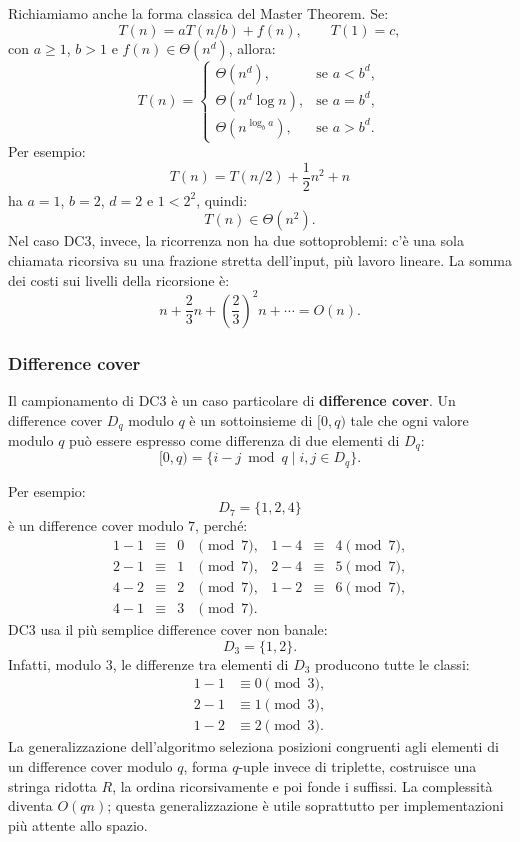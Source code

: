 \documentclass{article}
\theoremstyle{definition}
\numberwithin{equation}{section}
\begin{document}
Richiamiamo anche la forma classica del Master Theorem. Se:
\[
    T(n)=aT(n/b)+f(n),
    \qquad
    T(1)=c,
\]
con $a\geq 1$, $b>1$ e $f(n)\in \Theta(n^d)$, allora:
\[
    T(n)=
    \begin{cases}
        \Theta(n^d),          & \text{se } a<b^d, \\
        \Theta(n^d\log n),    & \text{se } a=b^d, \\
        \Theta(n^{\log_b a}), & \text{se } a>b^d.
    \end{cases}
\]
Per esempio:
\[
    T(n)=T(n/2)+\frac{1}{2}n^2+n
\]
ha $a=1$, $b=2$, $d=2$ e $1<2^2$, quindi:
\[
    T(n)\in\Theta(n^2).
\]
Nel caso DC3, invece, la ricorrenza non ha due sottoproblemi: c'è una sola chiamata ricorsiva su una frazione stretta dell'input, più lavoro lineare. La somma dei costi sui livelli della ricorsione è:
\[
    n+\frac{2}{3}n+\left(\frac{2}{3}\right)^2n+\cdots=O(n).
\]

\subsubsection{Difference cover}
Il campionamento di DC3 è un caso particolare di \textbf{difference cover}. Un difference cover $D_q$ modulo $q$ è un sottoinsieme di $[0,q)$ tale che ogni valore modulo $q$ può essere espresso come differenza di due elementi di $D_q$:
\begin{equation}\label{eq:difference_cover_definition}
    [0,q)
    =
    \{i-j \bmod q \mid i,j\in D_q\}.
\end{equation}

Per esempio:
\[
    D_7=\{1,2,4\}
\]
è un difference cover modulo $7$, perché:
\[
    \begin{array}{rclcrcl}
        1-1 & \equiv & 0 & \pmod 7, & 1-4 & \equiv & 4 \pmod 7, \\
        2-1 & \equiv & 1 & \pmod 7, & 2-4 & \equiv & 5 \pmod 7, \\
        4-2 & \equiv & 2 & \pmod 7, & 1-2 & \equiv & 6 \pmod 7, \\
        4-1 & \equiv & 3 & \pmod 7. &
    \end{array}
\]
DC3 usa il più semplice difference cover non banale:
\[
    D_3=\{1,2\}.
\]
Infatti, modulo $3$, le differenze tra elementi di $D_3$ producono tutte le classi:
\[
    \begin{aligned}
        1-1 & \equiv 0 \pmod 3, \\
        2-1 & \equiv 1 \pmod 3, \\
        1-2 & \equiv 2 \pmod 3.
    \end{aligned}
\]
La generalizzazione dell'algoritmo seleziona posizioni congruenti agli elementi di un difference cover modulo $q$, forma $q$-uple invece di triplette, costruisce una stringa ridotta $R$, la ordina ricorsivamente e poi fonde i suffissi. La complessità diventa $O(qn)$; questa generalizzazione è utile soprattutto per implementazioni più attente allo spazio.
\end{document}
